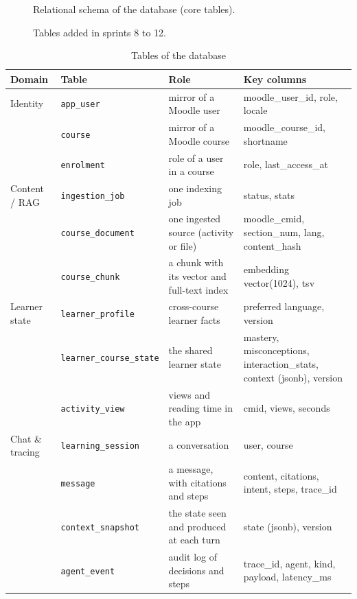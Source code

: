 \begin{figure}[htbp]
  \centering
  \caption{Relational schema of the database (core tables).}
  \label{fig-database}
\end{figure}

\begin{figure}[htbp]
  \centering
  \caption{Tables added in sprints 8 to 12.}
  \label{fig-database-ext}
\end{figure}

\begin{table}[htbp]
\centering
\caption{Tables of the database}
\label{tab-db-tables}
\scriptsize
\begin{tabularx}{\textwidth}{@{}L{2.0cm}L{3.4cm}YL{3.6cm}@{}}
\toprule
\textbf{Domain} & \textbf{Table} & \textbf{Role} & \textbf{Key columns} \\
\midrule
Identity & \texttt{app\_user} & mirror of a Moodle user & moodle\_user\_id, role, locale \\
 & \texttt{course} & mirror of a Moodle course & moodle\_course\_id, shortname \\
 & \texttt{enrolment} & role of a user in a course & role, last\_access\_at \\
Content / RAG & \texttt{ingestion\_job} & one indexing job & status, stats \\
 & \texttt{course\_document} & one ingested source (activity or file) & moodle\_cmid, section\_num, lang, content\_hash \\
 & \texttt{course\_chunk} & a chunk with its vector and full-text index & embedding vector(1024), tsv \\
Learner state & \texttt{learner\_profile} & cross-course learner facts & preferred language, version \\
 & \texttt{learner\_course\_state} & the shared learner state & mastery, misconceptions, interaction\_stats, context (jsonb), version \\
 & \texttt{activity\_view} & views and reading time in the app & cmid, views, seconds \\
Chat \& tracing & \texttt{learning\_session} & a conversation & user, course \\
 & \texttt{message} & a message, with citations and steps & content, citations, intent, steps, trace\_id \\
 & \texttt{context\_snapshot} & the state seen and produced at each turn & state (jsonb), version \\
 & \texttt{agent\_event} & audit log of decisions and steps & trace\_id, agent, kind, payload, latency\_ms \\

\end{tabularx}
\end{table}
